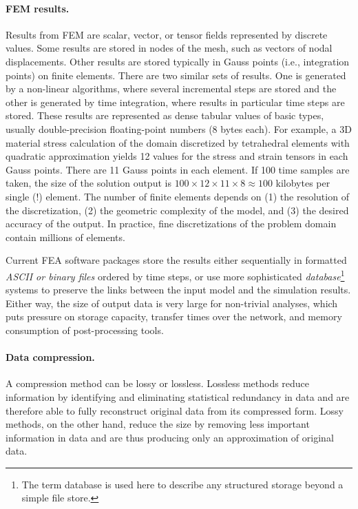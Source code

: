 \paragraph{FEM results.} Results from FEM are scalar, vector, or tensor fields represented by discrete values. Some results are stored in nodes of the mesh, such as vectors of nodal displacements. Other results are stored typically in Gauss points (i.e., integration points) on finite elements. There are two similar sets of results. One is generated by a non-linear algorithms, where several incremental steps are stored and the other is generated by time integration, where results in particular time steps are stored. These results are represented as dense tabular values of basic types, usually double-precision floating-point numbers (8 bytes each). For example, a 3D material stress calculation of the domain discretized by tetrahedral elements with quadratic approximation yields 12 values for the stress and strain tensors in each Gauss points. There are 11 Gauss points in each element. If 100 time samples are taken, the size of the solution output is $100 \times 12 \times 11 \times 8 \approx 100$ kilobytes per single (!) element. The number of finite elements depends on (1) the resolution of the discretization, (2) the geometric complexity of the model, and (3) the desired accuracy of the output. In practice, fine discretizations of the problem domain contain millions of elements.

Current FEA software packages store the results either sequentially in formatted \textit{ASCII or binary files} ordered by time steps, or use more sophisticated \textit{database}\footnote{The term database is used here to describe any structured storage beyond a simple file store.} systems to preserve the links between the input model and the simulation results. Either way, the size of output data is very large for non-trivial analyses, which puts pressure on storage capacity, transfer times over the network, and memory consumption of post-processing tools.

\paragraph{Data compression.} A compression method can be lossy or lossless. Lossless methods reduce information by identifying and eliminating statistical redundancy in data and are therefore able to fully reconstruct original data from its compressed form. Lossy methods, on the other hand, reduce the size by removing less important information in data and are thus producing only an approximation of original data.

